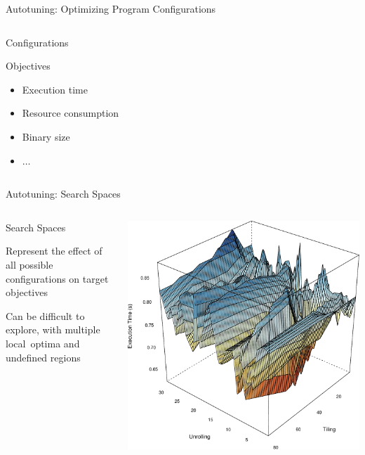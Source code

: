 \documentclass[10pt, compress, aspectratio=169, xcolor={table,usenames,dvipsnames}]{beamer}
\begin{document}
\begin{frame}[label={sec:orgb80100e}]{Autotuning: Optimizing Program Configurations}
\begin{columns}
\begin{column}{0.5\columnwidth}
\begin{block}{Configurations}
\begin{block}{Objectives}
\begin{itemize}
\item Execution time
\item Resource consumption
\item Binary size
\item \(\dots\)
\end{itemize}
\end{block}
\end{block}
\end{column}
\end{columns}
\end{frame}

\begin{frame}[label={sec:org40fb639}]{Autotuning: Search Spaces}
\begin{columns}
\begin{column}{0.4\columnwidth}
\begin{block}{Search Spaces}
\vspace{.2cm}

Represent the \alert{effect} of all possible
configurations on target objectives

Can be difficult to explore, with multiple \mbox{\alert{local optima}}
and \mbox{\alert{undefined}} \mbox{\alert{regions}}
\end{block}
\end{column}

\begin{column}{0.6\columnwidth}
\begin{center}
\begin{center}
\includegraphics[width=.8\columnwidth]{../../../img/bicgkernel_averaged_search_space.pdf}
\end{center}
\end{center}

\end{column}
\end{columns}
\end{frame}
\end{document}
